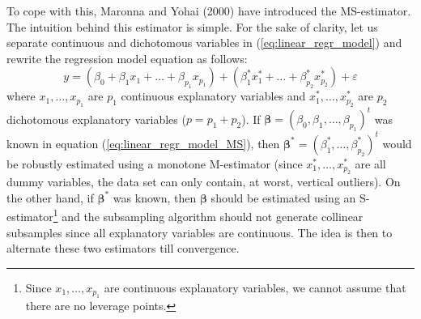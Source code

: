 To cope with this, Maronna and Yohai (2000) have introduced the MS-estimator.
The intuition behind this estimator is simple. For the sake of clarity, let us
separate continuous and dichotomous variables in (\ref{eq:linear_regr_model})
and rewrite the regression model equation as follows:
\begin{equation}
y=\left(  \beta_{0}+\beta_{1}x_{1}+\ldots+\beta_{p_{1}}x_{p_{1}}\right)
+\left(  \beta_{1}^{\ast}x_{1}^{\ast}+\ldots+\beta_{p_{2}}^{\ast}x_{p_{2}%
}^{\ast}\right)  +\varepsilon\label{eq:linear_regr_model_MS}%
\end{equation}
where $x_{1},\ldots,x_{p_{1}}$ are $p_{1}$ continuous explanatory variables
and $x_{1}^{\ast},\ldots,x_{p_{2}}^{\ast}$ are $p_{2}$ dichotomous explanatory
variables ($p=p_{1}+p_{2}$). If $\boldsymbol{\beta=}\left(  \beta_{0}%
,\beta_{1},\ldots,\beta_{p_{1}}\right)  ^{t}$ was known in equation
(\ref{eq:linear_regr_model_MS}), then $\boldsymbol\beta^{\ast}%
\boldsymbol{=}\left(  \beta_{1}^{\ast},\ldots,\beta_{p_{2}}^{\ast}\right)
^{t}$ would be robustly estimated using a monotone M-estimator (since
$x_{1}^{\ast},\ldots,x_{p_{2}}^{\ast}$ are all dummy variables, the data set
can only contain, at worst, vertical outliers). On the other hand, if
$\boldsymbol\beta^{\ast}$ was known, then $\boldsymbol\beta$ should be
estimated using an S-estimator\footnote{Since $x_{1},\ldots,x_{p_{1}}$ are
continuous explanatory variables, we cannot assume that there are no leverage
points.} and the subsampling algorithm should not generate collinear
subsamples since all explanatory variables are continuous. The idea is then to
alternate these two estimators till convergence.

